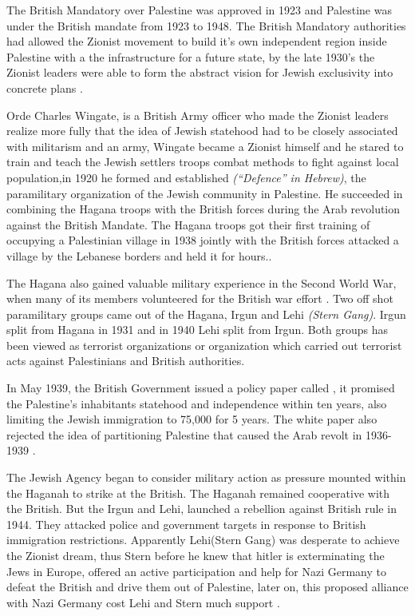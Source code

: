  
 
 The British Mandatory over Palestine was approved in 1923 and Palestine was under the British mandate from 1923 to 1948. The British Mandatory authorities had allowed the Zionist movement to build it's own independent region inside Palestine with a the infrastructure for a future state, by the late 1930's the Zionist leaders were able to form the abstract vision for Jewish exclusivity into concrete plans \citep{Pappe2006}.  
 
Orde Charles Wingate, is a British Army officer who made the Zionist leaders realize more fully that the idea of Jewish statehood had to be closely associated with militarism and an army, Wingate became a Zionist himself and he stared to train and teach the Jewish settlers troops combat methods to fight against local population,in 1920 he formed and established  \textit{(“Defence” in Hebrew)}, the paramilitary organization of the Jewish community in Palestine. He succeeded in combining the Hagana troops with the British forces during the Arab revolution against the British Mandate. The Hagana troops got their first training of occupying a Palestinian village in 1938 jointly with the British forces attacked a village by the Lebanese borders and held it for hours\citep{Pappe2006}.\cite [p.112]{Fenby2018}. 

The Hagana also gained valuable military experience in the Second
World War, when many of its members volunteered for the British war
effort \citep{Pappe2006}. Two off shot paramilitary groups came out of the Hagana, Irgun and Lehi \textit{(Stern Gang)}. Irgun split from Hagana in 1931 and in 1940 Lehi split from Irgun\citep{Shlaim2014}. Both groups has been viewed as terrorist organizations or organization which carried out terrorist acts against Palestinians and British authorities\citep{Bell1976}.   


In May 1939, the British Government issued a policy paper called , it promised the Palestine's inhabitants statehood and independence within ten years, also limiting the Jewish immigration to 75,000 for 5 years. The white paper also rejected the idea of partitioning Palestine that caused the Arab revolt in 1936-1939 \citep{Morris2004}\citep{Fenby2018}.

The Jewish Agency began to consider military action as pressure mounted within the Haganah to strike at the British. The Haganah remained cooperative with the British. But the Irgun and Lehi, launched a rebellion against British rule in 1944. They attacked police and government targets in response to British immigration restrictions. 
Apparently Lehi(Stern Gang) was desperate to achieve the Zionist dream, thus Stern before he knew that hitler is exterminating the Jews in Europe, offered an active participation and help for Nazi Germany to defeat the British and drive them out of Palestine, later on, this proposed alliance with Nazi Germany cost Lehi and Stern much support \citep{Shlaim2014}\citep{Heller1995}\citep{Grob-Fitzgibbon2011}. 

